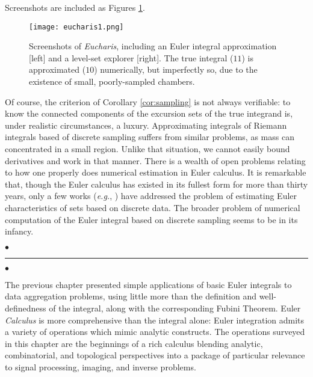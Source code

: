 \documentclass{psapm-l}
\theoremstyle{definition}
\theoremstyle{remark}
\numberwithin{equation}{section}
\begin{document}
Screenshots are included as Figures \ref{fig:eucharis1}.

\begin{figure}[hbt]
\begin{center}
\texttt{[image: eucharis1.png]}
\caption{Screenshots of {\em Eucharis}, including an Euler integral approximation [left] and a level-set explorer [right]. The true integral ($11$) is approximated ($10$) numerically, but imperfectly so, due to the existence of small, poorly-sampled chambers.}
\label{fig:eucharis1}
\end{center}
\end{figure}

Of course, the criterion of Corollary \ref{cor:sampling} is not always verifiable: to know the connected components of the excursion sets of the true integrand is, under realistic circumstances, a luxury. Approximating integrals of Riemann integrals based of discrete sampling suffers from similar problems, as mass can concentrated in a small region. Unlike that situation, we cannot easily bound derivatives and work in that manner. There is a wealth of open problems relating to how one properly does numerical estimation in Euler calculus. It is remarkable that, though the Euler calculus has existed in its fullest form for more than thirty years, only a few works ({{\em e.g.}}, \cite{Klain}) have addressed the problem of estimating Euler characteristics of sets based on discrete data. The broader problem of numerical computation of the Euler integral based on discrete sampling seems to be in its infancy.

{
\begin{center}
\nointerlineskip\vspace{-0.04in}
        $\bullet$\hfill\rule{0.77\linewidth}{1.0pt}\hfill$\bullet$
\par\nointerlineskip\vspace{-0.01in}
\end{center}
}
\vspace{0.1in}

The previous chapter presented simple applications of basic Euler integrals to data aggregation problems, using little more than the definition and well-definedness of the integral, along with the corresponding Fubini Theorem. Euler {\em Calculus} is more comprehensive than the integral alone: Euler integration admits a variety of operations which mimic analytic constructs. The operations surveyed in this chapter are the beginnings of a rich calculus blending analytic, combinatorial, and topological perspectives into a package of particular relevance to signal processing, imaging, and inverse problems.
\end{document}
